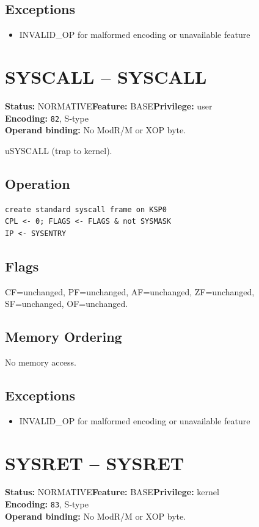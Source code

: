 \documentclass[10pt]{article}
\begin{document}
\subsection*{Exceptions}
\begin{itemize}
\item INVALID\_OP for malformed encoding or unavailable feature
\end{itemize}
\clearpage

\section{SYSCALL -- SYSCALL}
\textbf{Status:} NORMATIVE\quad \textbf{Feature:} BASE\quad \textbf{Privilege:} user\\
\textbf{Encoding:} \texttt{82}, S-type\\
\textbf{Operand binding:} No ModR/M or XOP byte.

uSYSCALL (trap to kernel).

\subsection*{Operation}
\begin{lstlisting}
create standard syscall frame on KSP0
CPL <- 0; FLAGS <- FLAGS & not SYSMASK
IP <- SYSENTRY
\end{lstlisting}
\subsection*{Flags}
CF=unchanged, PF=unchanged, AF=unchanged, ZF=unchanged, SF=unchanged, OF=unchanged.
\subsection*{Memory Ordering}
No memory access.
\subsection*{Exceptions}
\begin{itemize}
\item INVALID\_OP for malformed encoding or unavailable feature
\end{itemize}
\clearpage

\section{SYSRET -- SYSRET}
\textbf{Status:} NORMATIVE\quad \textbf{Feature:} BASE\quad \textbf{Privilege:} kernel\\
\textbf{Encoding:} \texttt{83}, S-type\\
\textbf{Operand binding:} No ModR/M or XOP byte.
\end{document}
